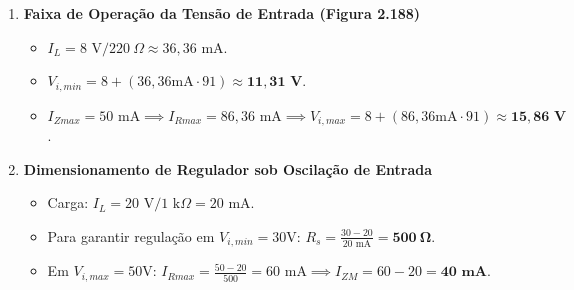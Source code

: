 \documentclass[a4paper,12pt]{article}
\begin{document}
\begin{enumerate}[label=\textbf{Questão \arabic*:}, leftmargin=*]
    \item \textbf{Faixa de Operação da Tensão de Entrada (Figura 2.188)}
    \begin{itemize}
        \item $I_L = 8\text{ V}/220~\Omega \approx 36,36\text{ mA}$.
        \item $V_{i,min} = 8 + (36,36\text{mA} \cdot 91) \approx \mathbf{11,31\text{ V}}$.
        \item $I_{Zmax} = 50\text{ mA} \implies I_{Rmax} = 86,36\text{ mA} \implies V_{i,max} = 8 + (86,36\text{mA} \cdot 91) \approx \mathbf{15,86\text{ V}}$.
    \end{itemize}

    \item \textbf{Dimensionamento de Regulador sob Oscilação de Entrada}
    \begin{itemize}
        \item Carga: $I_L = 20\text{ V}/1\text{ k}\Omega = 20\text{ mA}$.
        \item Para garantir regulação em $V_{i,min}=30\text{V}$: $R_s = \frac{30-20}{20\text{ mA}} = \mathbf{500~\Omega}$.
        \item Em $V_{i,max}=50\text{V}$: $I_{Rmax} = \frac{50-20}{500} = 60\text{ mA} \implies I_{ZM} = 60 - 20 = \mathbf{40\text{ mA}}$.
    \end{itemize}

\end{enumerate}
\end{document}
